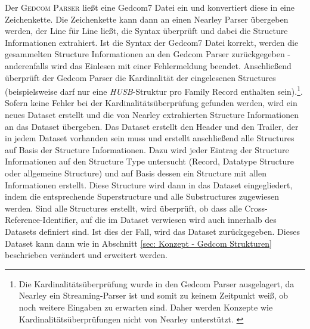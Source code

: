 Der \textsc{Gedcom Parser} ließt eine Gedcom7 Datei ein und konvertiert diese in eine Zeichenkette. Die Zeichenkette kann dann an einen Nearley Parser übergeben werden, der Line für Line ließt, die Syntax überprüft und dabei die Structure Informationen extrahiert. Ist die Syntax der Gedcom7 Datei korrekt, werden die gesammelten Structure Informationen an den Gedcom Parser zurückgegeben - anderenfalls wird das Einlesen mit einer Fehlermeldung beendet. Anschließend überprüft der Gedcom Parser die Kardinalität der eingelesenen Structures (beispielsweise darf nur eine \textit{HUSB}-Struktur pro Family Record enthalten sein).\footnote{Die Kardinalitätsüberprüfung wurde in den Gedcom Parser ausgelagert, da Nearley ein Streaming-Parser ist und somit zu keinem Zeitpunkt weiß, ob noch weitere Eingaben zu erwarten sind. Daher werden Konzepte wie Kardinalitätsüberprüfungen nicht von Nearley unterstützt. \cite{NearleyDoc}}. Sofern keine Fehler bei der Kardinalitätsüberprüfung gefunden werden, wird ein neues Dataset erstellt und die von Nearley extrahierten Structure Informationen an das Dataset übergeben. Das Dataset erstellt den Header und den Trailer, der in jedem Dataset vorhanden sein muss und erstellt anschließend alle Structures auf Basis der Structure Informationen. Dazu wird jeder Eintrag der Structure Informationen auf den Structure Type untersucht (Record, Datatype Structure oder allgemeine Structure) und auf Basis dessen ein Structure mit allen Informationen erstellt. Diese Structure wird dann in das Dataset eingegliedert, indem die entsprechende Superstructure und alle Substructures zugewiesen werden. Sind alle Structures erstellt, wird überprüft, ob dass alle Cross-Reference-Identifier, auf die im Dataset verwiesen wird auch innerhalb des Datasets definiert sind. Ist dies der Fall, wird das Dataset zurückgegeben. Dieses Dataset kann dann wie in Abschnitt \ref{sec: Konzept - Gedcom Strukturen} beschrieben verändert und erweitert werden.

